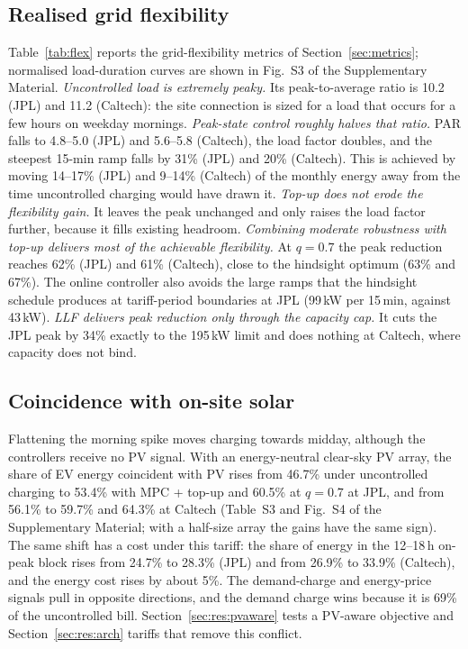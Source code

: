\subsection{Realised grid flexibility}\label{sec:res:flex}
Table~\ref{tab:flex} reports the grid-flexibility metrics of Section~\ref{sec:metrics}; normalised load-duration curves are shown in Fig.~S3 of the Supplementary Material.
\emph{Uncontrolled load is extremely peaky.} Its peak-to-average ratio is 10.2 (JPL) and 11.2 (Caltech): the site connection is sized for a load that occurs for a few hours on weekday mornings. \emph{Peak-state control roughly halves that ratio.} PAR falls to 4.8--5.0 (JPL) and 5.6--5.8 (Caltech), the load factor doubles, and the steepest 15-min ramp falls by 31\% (JPL) and 20\% (Caltech). This is achieved by moving 14--17\% (JPL) and 9--14\% (Caltech) of the monthly energy away from the time uncontrolled charging would have drawn it. \emph{Top-up does not erode the flexibility gain.} It leaves the peak unchanged and only raises the load factor further, because it fills existing headroom. \emph{Combining moderate robustness with top-up delivers most of the achievable flexibility.} At $q=0.7$ the peak reduction reaches 62\% (JPL) and 61\% (Caltech), close to the hindsight optimum (63\% and 67\%). The online controller also avoids the large ramps that the hindsight schedule produces at tariff-period boundaries at JPL (99\,kW per 15\,min, against 43\,kW). \emph{LLF delivers peak reduction only through the capacity cap.} It cuts the JPL peak by 34\% exactly to the 195\,kW limit and does nothing at Caltech, where capacity does not bind.




\subsection{Coincidence with on-site solar}\label{sec:res:pv}
Flattening the morning spike moves charging towards midday, although the controllers receive no PV signal. With an energy-neutral clear-sky PV array, the share of EV energy coincident with PV rises from 46.7\% under uncontrolled charging to 53.4\% with MPC + top-up and 60.5\% at $q=0.7$ at JPL, and from 56.1\% to 59.7\% and 64.3\% at Caltech (Table~S3 and Fig.~S4 of the Supplementary Material; with a half-size array the gains have the same sign). The same shift has a cost under this tariff: the share of energy in the 12--18\,h on-peak block rises from 24.7\% to 28.3\% (JPL) and from 26.9\% to 33.9\% (Caltech), and the energy cost rises by about 5\%. The demand-charge and energy-price signals pull in opposite directions, and the demand charge wins because it is 69\% of the uncontrolled bill. Section~\ref{sec:res:pvaware} tests a PV-aware objective and Section~\ref{sec:res:arch} tariffs that remove this conflict.

